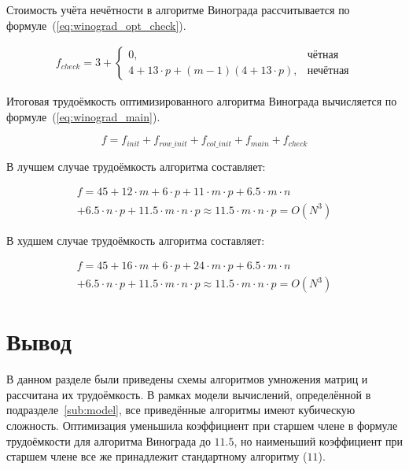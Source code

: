 Стоимость учёта нечётности в алгоритме Винограда рассчитывается по формуле~(\ref{eq:winograd_opt_check}).

\begin{equation}
    \label{eq:winograd_opt_check}
    \begin{gathered}
        f_{check} = 3 + \begin{cases}
            0, & \text{чётная} \\
            4 + 13 \cdot p + (m - 1)(4 + 13 \cdot p), & \text{нечётная}
        \end{cases}
    \end{gathered}
\end{equation}

Итоговая трудоёмкость оптимизированного алгоритма Винограда вычисляется по формуле~(\ref{eq:winograd_main}).

\begin{equation}
    \label{eq:winograd_main}
    f = f_{init} + f_{row\_init} + f_{col\_init} + f_{main} + f_{check}
\end{equation}

В лучшем случае трудоёмкость алгоритма составляет:

\begin{equation}
    \begin{gathered}
        f = 45 + 12\cdot m + 6 \cdot p + 11\cdot m\cdot p + 6.5 \cdot m \cdot n \\ + 6.5 \cdot n \cdot p + 11.5 \cdot m \cdot n \cdot p \approx 11.5 \cdot m \cdot n \cdot p = O(N^3)
    \end{gathered}
\end{equation}

В худшем случае трудоёмкость алгоритма составляет:

\begin{equation}
    \begin{gathered}
        f = 45 + 16\cdot m + 6 \cdot p + 24\cdot m\cdot p + 6.5 \cdot m \cdot n \\ + 6.5 \cdot n \cdot p + 11.5 \cdot m \cdot n \cdot p \approx 11.5 \cdot m \cdot n \cdot p = O(N^3)
    \end{gathered}
\end{equation}

\section*{Вывод}

В данном разделе были приведены схемы алгоритмов умножения матриц и рассчитана их трудоёмкость. В рамках модели вычислений, определённой в подразделе~\ref{sub:model}, все приведённые алгоритмы имеют кубическую сложность. Оптимизация уменьшила коэффициент при старшем члене в формуле трудоёмкости для алгоритма Винограда до $11.5$, но наименьший коэффициент при старшем члене все же принадлежит стандартному алгоритму ($11$).